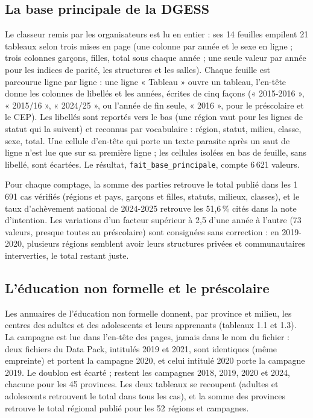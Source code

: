 \documentclass{article}
\begin{document}
\subsection{La base principale de la DGESS}

Le classeur remis par les organisateurs est lu en entier : ses 14 feuilles empilent 21 tableaux selon trois mises en page (une colonne par année et le sexe en ligne ; trois colonnes garçons, filles, total sous chaque année ; une seule valeur par année pour les indices de parité, les structures et les salles). Chaque feuille est parcourue ligne par ligne : une ligne « Tableau » ouvre un tableau, l'en-tête donne les colonnes de libellés et les années, écrites de cinq façons (« 2015-2016 », « 2015/16 », « 2024/25 », ou l'année de fin seule, « 2016 », pour le préscolaire et le CEP). Les libellés sont reportés vers le bas (une région vaut pour les lignes de statut qui la suivent) et reconnus par vocabulaire : région, statut, milieu, classe, sexe, total. Une cellule d'en-tête qui porte un texte parasite après un saut de ligne n'est lue que sur sa première ligne ; les cellules isolées en bas de feuille, sans libellé, sont écartées. Le résultat, \texttt{fait\_base\_principale}, compte 6\,621 valeurs.

Pour chaque comptage, la somme des parties retrouve le total publié dans les 1\,691 cas vérifiés (régions et pays, garçons et filles, statuts, milieux, classes), et le taux d'achèvement national de 2024-2025 retrouve les 51,6\,\% cités dans la note d'intention. Les variations d'un facteur supérieur à 2,5 d'une année à l'autre (73 valeurs, presque toutes au préscolaire) sont consignées sans correction : en 2019-2020, plusieurs régions semblent avoir leurs structures privées et communautaires interverties, le total restant juste.

\subsection{L'éducation non formelle et le préscolaire}

Les annuaires de l'éducation non formelle donnent, par province et milieu, les centres des adultes et des adolescents et leurs apprenants (tableaux 1.1 et 1.3). La campagne est lue dans l'en-tête des pages, jamais dans le nom du fichier : deux fichiers du Data Pack, intitulés 2019 et 2021, sont identiques (même empreinte) et portent la campagne 2020, et celui intitulé 2020 porte la campagne 2019. Le doublon est écarté ; restent les campagnes 2018, 2019, 2020 et 2024, chacune pour les 45 provinces. Les deux tableaux se recoupent (adultes et adolescents retrouvent le total dans tous les cas), et la somme des provinces retrouve le total régional publié pour les 52 régions et campagnes.
\end{document}
